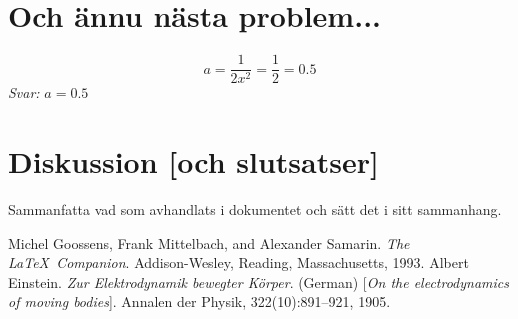 \documentclass[a4paper,12pt]{article}
\begin{document}
\section{Och ännu nästa problem...}
\label{sec:uppgN}


\begin{displaymath}
  a=\frac{1}{2x^2}=\frac{1}{2}=0.5
\end{displaymath}
\emph{Svar:} $a=0.5$
\section{Diskussion [och slutsatser]}
\label{sec:disk}


Sammanfatta vad som avhandlats i dokumentet och sätt det i
sitt sammanhang.
%
\begin{thebibliography}{99}
%
Michel Goossens, Frank Mittelbach, and Alexander Samarin. 
\textit{The \LaTeX\ Companion}. 
Addison-Wesley, Reading, Massachusetts, 1993.
%
Albert Einstein. 
\textit{Zur Elektrodynamik bewegter K{\"o}rper}. (German) 
[\textit{On the electrodynamics of moving bodies}]. 
Annalen der Physik, 322(10):891–921, 1905.
%
\end{thebibliography}
%
\end{document}
